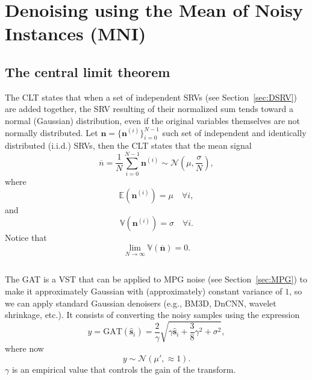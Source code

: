 \chapter{Denoising using the Mean of Noisy Instances (MNI)}

\section{The central limit theorem}
\label{sec:CLT}

The \gls{CLT} states that when a set of independent \glspl{SRV} (see
Section~\ref{sec:DSRV}) are added together, the \gls{SRV} resulting of their normalized sum tends
toward a normal (Gaussian) distribution, even if the original
variables themselves are not normally distributed. Let
$\mathbf{n}=\{\mathbf{n}^{(i)}\}_{i=0}^{N-1}$ such set of independent and
identically distributed (i.i.d.) \glspl{SRV}, then the \gls{CLT} states that the mean signal
\begin{equation}
  \overline{n} = \frac{1}{N}\sum_{i=0}^{N-1}\mathbf{n}^{(i)}\sim\mathcal{N}(\mu,\frac{\sigma}{N}),
\end{equation}
where
\begin{equation}
  \mathbb{E}(\mathbf{n}^{(i)})=\mu\quad\forall i,
\end{equation}
and
\begin{equation}
  \mathbb{V}(\mathbf{n}^{(i)})=\sigma\quad\forall i.
\end{equation}
Notice that
\begin{equation}
  \lim_{N\rightarrow\infty}\mathbb{V}(\overline{\mathbf{n}}) = 0.
\end{equation}


\section{}
The \acrshort{GAT} \cite{foi2008practical,makitalo2012optimal} is a
\gls{VST} that can be applied to \gls{MPG} noise (see
Section~\ref{sec:MPG}) to make it approximately Gaussian with
(approximately) constant variance of $1$, so we can apply standard
Gaussian denoisers (e.g., \gls{BM3D}, \gls{DnCNN}, wavelet shrinkage,
etc.). It consists of converting the noisy samples using the
expression
\begin{equation}
  y = \text{GAT}(\hat{\mathbf{s}}_i)=\frac{2}{\gamma}\sqrt{\gamma\hat{\mathbf{s}}_i+\frac{3}{8}\gamma^2+\sigma^2},
\end{equation}
where now
\begin{equation}
  y\sim\mathcal{N}(\mu',\approx 1).
\end{equation}
$\gamma$ is an empirical value that controls the gain of the transform.

